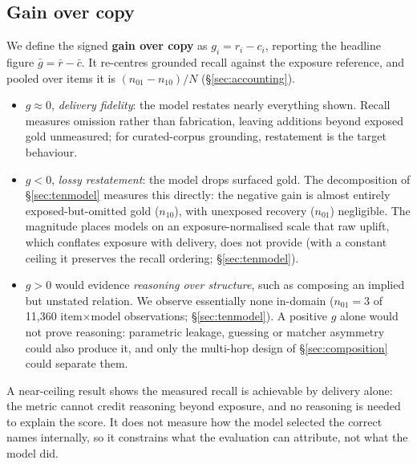\documentclass[10pt,twocolumn]{article}
\begin{document}
\subsection{Gain over copy}
We define the signed \textbf{gain over copy} as $g_i=r_i-c_i$, reporting the headline figure $\bar g=\bar r-\bar c$. It re-centres grounded recall against the exposure reference, and pooled over items it is $(n_{01}-n_{10})/N$ (\S\ref{sec:accounting}).
\begin{itemize}[topsep=2pt,itemsep=1pt,leftmargin=1.4em]
\item $g\approx0$, \emph{delivery fidelity}: the model restates nearly everything shown. Recall measures omission rather than fabrication, leaving additions beyond exposed gold unmeasured; for curated-corpus grounding, restatement is the target behaviour.
\item $g<0$, \emph{lossy restatement}: the model drops surfaced gold. The decomposition of \S\ref{sec:tenmodel} measures this directly: the negative gain is almost entirely exposed-but-omitted gold ($n_{10}$), with unexposed recovery ($n_{01}$) negligible. The magnitude places models on an exposure-normalised scale that raw uplift, which conflates exposure with delivery, does not provide (with a constant ceiling it preserves the recall ordering; \S\ref{sec:tenmodel}).
\item $g>0$ would evidence \emph{reasoning over structure}, such as composing an implied but unstated relation. We observe essentially none in-domain ($n_{01}=3$ of 11{,}360 item$\times$model observations; \S\ref{sec:tenmodel}). A positive $g$ alone would not prove reasoning: parametric leakage, guessing or matcher asymmetry could also produce it, and only the multi-hop design of \S\ref{sec:composition} could separate them.
\end{itemize}
A near-ceiling result shows the measured recall is achievable by delivery alone: the metric cannot credit reasoning beyond exposure, and no reasoning is needed to explain the score. It does not measure how the model selected the correct names internally, so it constrains what the evaluation can attribute, not what the model did.
\end{document}
